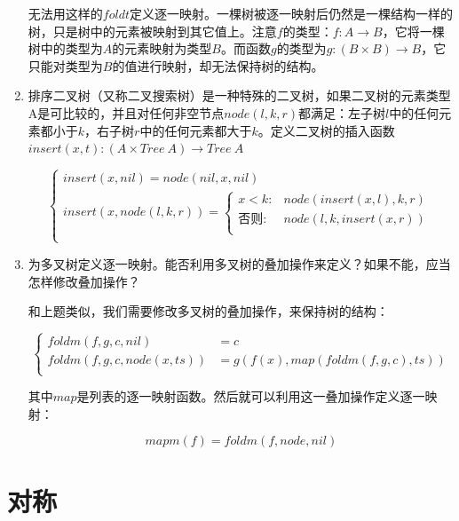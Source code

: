 \documentclass[UTF8]{article}
\begin{document}
\begin{enumerate}
无法用这样的$foldt$定义逐一映射。一棵树被逐一映射后仍然是一棵结构一样的树，只是树中的元素被映射到其它值上。注意$f$的类型：$f : A \to B$，它将一棵树中的类型为$A$的元素映射为类型$B$。而函数$g$的类型为$g : (B \times B) \to B$，它只能对类型为$B$的值进行映射，却无法保持树的结构。

\item 排序二叉树（又称二叉搜索树）是一种特殊的二叉树，如果二叉树的元素类型A是可比较的，并且对任何非空节点$node(l, k, r)$都满足：左子树$l$中的任何元素都小于$k$，右子树$r$中的任何元素都大于$k$。定义二叉树的插入函数$insert(x, t) : (A \times Tree\ A) \to Tree\ A$

\[ \begin{cases}
insert(x, nil) = node(nil, x, nil) \\
insert(x, node(l, k, r)) = \begin{cases}
  x < k: & node(insert(x, l), k, r) \\
  \text{否则}: & node(l, k, insert(x, r)) \\
\end{cases} \\
\end{cases}\]

\item 为多叉树定义逐一映射。能否利用多叉树的叠加操作来定义？如果不能，应当怎样修改叠加操作？

和上题类似，我们需要修改多叉树的叠加操作，来保持树的结构：

\[
\begin{cases}
foldm(f, g, c, nil) & = c \\
foldm(f, g, c, node(x, ts)) & = g(f(x), map(foldm(f, g, c), ts)) \\
\end{cases}
\]

其中$map$是列表的逐一映射函数。然后就可以利用这一叠加操作定义逐一映射：

\[
mapm(f) = foldm(f, node, nil)
\]

\end{enumerate}

\section{对称}
\shipoutAnswer
\end{document}
